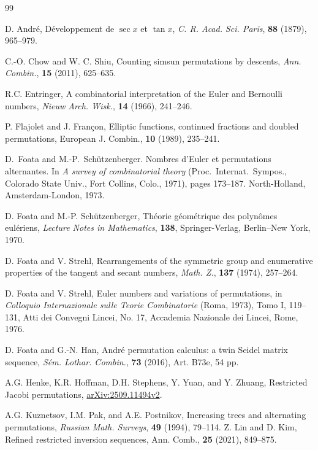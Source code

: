 \documentclass[12pt]{article}
\numberwithin{equation}{section}
\theoremstyle{plain}
\begin{document}
	
\begin{thebibliography}{99}

		 D. Andr\'e, D\'eveloppement de $\sec x$ et $\tan x$,  \textit{C. R. Acad. Sci. Paris},   \textbf{88} (1879), 965--979.
		
		 C.-O. Chow and W. C.  Shiu, Counting simsun permutations by descents, \textit{Ann.  Combin.},  \textbf{15} (2011), 625--635.
				
		 R.C. Entringer, A combinatorial interpretation of the Euler and Bernoulli numbers,  \textit{Nieuw Arch. Wisk.},   \textbf{14} (1966), 241--246.
		
		
		
		 P. Flajolet and J. Fran\c{c}on, Elliptic functions, continued fractions and doubled permutations, 
European J. Combin., {\bf10} (1989),  235--241.
		
		D.~Foata and M.-P.~Sch{\"u}tzenberger.
		Nombres d'Euler et permutations alternantes.
		In \emph{A survey of combinatorial theory} (Proc.\ Internat.\ Sympos., Colorado State Univ., Fort Collins, Colo., 1971), pages 173--187. North-Holland, Amsterdam-London, 1973.
		
		 D. Foata and M.-P. Sch\"utzenberger, Th\'eorie g\'eom\'etrique des polyn\^omes eul\'eriens,  \textit{Lecture Notes in Mathematics}, \textbf{138}, Springer-Verlag, Berlin--New York, 1970.
		
		 D. Foata and V. Strehl, Rearrangements of the symmetric group and enumerative properties of the tangent and secant numbers,  \textit{Math. Z.},   \textbf{137}  (1974), 257--264.
			
		 D. Foata and V. Strehl, Euler numbers and variations of permutations, in \textit{Colloquio Internazionale sulle Teorie Combinatorie} (Roma, 1973), Tomo I, 119--131, Atti dei Convegni Lincei, No. 17, Accademia Nazionale dei Lincei, Rome, 1976.
		
		 D. Foata and G.-N. Han, Andr\'e permutation calculus: a twin Seidel matrix sequence, \textit{S\'em. Lothar. Combin.},  \textbf{73} (2016), Art. B73e, 54 pp.
		
		  A.G. Henke, K.R. Hoffman, D.H. Stephens, Y. Yuan, and Y. Zhuang, Restricted Jacobi permutations, \href{https://arxiv.org/abs/2509.11494}{arXiv:2509.11494v2}.
		 
		  A.G. Kuznetsov, I.M. Pak, and A.E. Postnikov, 
		 Increasing trees and alternating permutations,  \textit{Russian Math. Surveys},  \textbf{49}  (1994), 79--114.	 
		  Z. Lin and D. Kim, Refined restricted inversion sequences,  Ann. Comb., {\bf25} (2021), 849--875.


\end{thebibliography}
\end{document}
